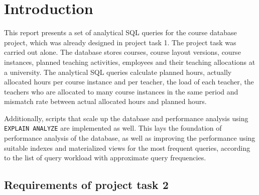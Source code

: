 \documentclass[a4paper]{scrartcl}
\renewcommand{\_}{\textunderscore\allowbreak}
\begin{document}



\section{Introduction}
\label{sec:introduction}


This report presents a set of analytical SQL queries for the course database project, which was already designed in project task 1. The project task was carried out alone. The database stores courses, course layout versions, course instances, planned teaching activities, employees and their teaching allocations at a university. The analytical SQL queries calculate planned hours, actually allocated hours per course instance and per teacher, the load of each teacher, the teachers who are allocated to many course instances in the same period and mismatch rate between actual allocated hours and planned hours.

Additionally, scripts that scale up the database and performance analysis using \texttt{EXPLAIN ANALYZE} are implemented as well. This lays the foundation of performance analysis of the database, as well as improving the performance using suitable indexes and materialized views for the most frequent queries, according to the list of query workload with approximate query frequencies.

\subsection{Requirements of project task 2}
\label{sec:requirements}
\end{document}
